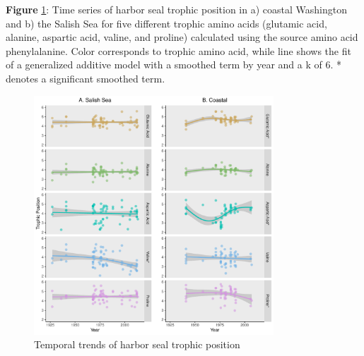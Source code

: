 \documentclass [11pt, proquest] {uwthesis}[2015/03/03]
\begin{document}
\textbf{Figure} \ref{fig:year}: Time series of harbor seal trophic
position in a) coastal Washington and b) the Salish Sea for five
different trophic amino acids (glutamic acid, alanine, aspartic acid,
valine, and proline) calculated using the source amino acid
phenylalanine. Color corresponds to trophic amino acid, while line shows
the fit of a generalized additive model with a smoothed term by year and
a k of 6. * denotes a significant smoothed term. \newline 
\begin{figure}[h]
\centering
  \includegraphics[width=0.8\textwidth]{figure/Ch3/FigureS6.pdf}
  \caption{Temporal trends of harbor seal trophic position}
  \label{fig:year}
\end{figure}
\clearpage
\end{document}
